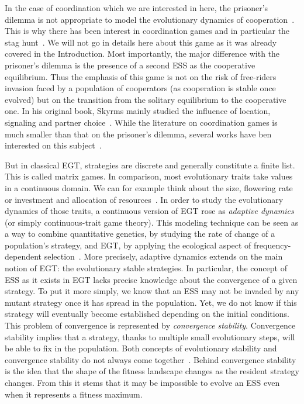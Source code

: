     In the case of coordination which we are interested in here, the prisoner's dilemma is not appropriate to model the evolutionary dynamics of cooperation~\parencite{Alvard2002, Skyrms2004}. This is why there has been interest in coordination games and in particular the stag hunt~\parencite{Skyrms2004, Requejo2013a}. We will not go in details here about this game as it was already covered in the Introduction. Most importantly, the major difference with the prisoner's dilemma is the presence of a second ESS as the cooperative equilibrium. Thus the emphasis of this game is not on the risk of free-riders invasion faced by a population of cooperators (as cooperation is stable once evolved) but on the transition from the solitary equilibrium to the cooperative one. In his original book, Skyrms mainly studied the influence of location, signaling and partner choice~\parencite{Skyrms2004}. While the literature on coordination games is much smaller than that on the prisoner's dilemma, several works have ben interested on this subject~\parencite{Santos2006, Pacheco2009, Iyer2016}.


    But in classical EGT, strategies are discrete and generally constitute a finite list. This is called matrix games. In comparison, most evolutionary traits take values in a continuous domain. We can for example think about the size, flowering rate or investment and allocation of resources~\parencite{McGill2007}. In order to study the evolutionary dynamics of those traits, a continuous version of EGT rose as \emph{adaptive dynamics} (or simply continuous-trait game theory). This modeling technique can be seen as a way to combine quantitative genetics, by studying the rate of change of a population's strategy, and EGT, by applying the ecological aspect of frequency-dependent selection~\parencite{Geritz1998, McGill2007}. More precisely, adaptive dynamics extends on the main notion of EGT: the evolutionary stable strategies. In particular, the concept of ESS as it exists in EGT lacks precise knowledge about the convergence of a given strategy. To put it more simply, we know that an ESS may not be invaded by any mutant strategy once it has spread in the population. Yet, we do not know if this strategy will eventually become established depending on the initial conditions. This problem of convergence is represented by \emph{convergence stability}. Convergence stability implies that a strategy, thanks to multiple small evolutionary steps, will be able to fix in the population. Both concepts of evolutionary stability and convergence stability do not always come together~\parencite{Eshel1981, Eshel1983}. Behind convergence stability is the idea that the shape of the fitness landscape changes as the resident strategy changes. From this it stems that it may be impossible to evolve an ESS even when it represents a fitness maximum.

